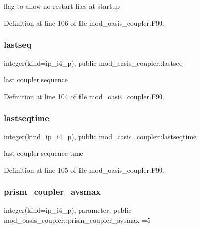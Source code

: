 flag to allow no restart files at startup 



Definition at line 106 of file mod\+\_\+oasis\+\_\+coupler.\+F90.

\mbox{\label{namespacemod__oasis__coupler_a0cb9b8a96c10385d38fa244d920c7eaf}} 
\subsubsection{\texorpdfstring{lastseq}{lastseq}}
{\footnotesize\ttfamily integer(kind=ip\+\_\+i4\+\_\+p), public mod\+\_\+oasis\+\_\+coupler\+::lastseq}



last coupler sequence 



Definition at line 104 of file mod\+\_\+oasis\+\_\+coupler.\+F90.

\mbox{\label{namespacemod__oasis__coupler_a47f4727f94719892d837f6a1545d3d08}} 
\subsubsection{\texorpdfstring{lastseqtime}{lastseqtime}}
{\footnotesize\ttfamily integer(kind=ip\+\_\+i4\+\_\+p), public mod\+\_\+oasis\+\_\+coupler\+::lastseqtime}



last coupler sequence time 



Definition at line 105 of file mod\+\_\+oasis\+\_\+coupler.\+F90.

\mbox{\label{namespacemod__oasis__coupler_a6f166f099a134dffba97a168d28a3c01}} 
\subsubsection{\texorpdfstring{prism\+\_\+coupler\+\_\+avsmax}{prism\_coupler\_avsmax}}
{\footnotesize\ttfamily integer(kind=ip\+\_\+i4\+\_\+p), parameter, public mod\+\_\+oasis\+\_\+coupler\+::prism\+\_\+coupler\+\_\+avsmax =5}



